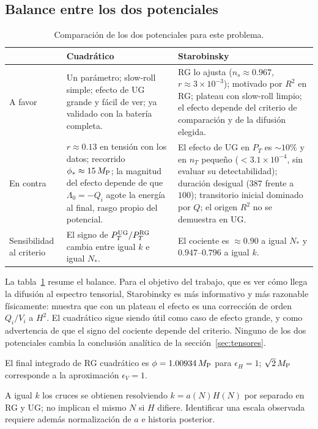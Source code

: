 \subsection{Balance entre los dos potenciales}
\label{sec:balancepot}

\begin{table}[t]
\centering\small
\renewcommand{\arraystretch}{1.25}
\begin{tabular}{@{}p{2.1cm}p{6.3cm}p{6.3cm}@{}}
\toprule
 & \textbf{Cuadrático} & \textbf{Starobinsky}\\
\midrule
A favor & Un parámetro; slow-roll simple; efecto de UG grande y fácil de ver; ya validado con la batería completa. & RG lo ajusta ($n_s\approx0.967$, $r\approx3\times10^{-3}$); motivado por $R^2$ en RG; plateau con slow-roll limpio; el efecto depende del criterio de comparación y de la difusión elegida.\\
En contra & $r\approx0.13$ en tensión con los datos; recorrido $\phi_*\approx15\,M_{\rm P}$; la magnitud del efecto depende de que $\Lambda_0=-Q_i$ agote la energía al final, rasgo propio del potencial. & El efecto de UG en $P_T$ es $\sim10\%$ y en $n_T$ pequeño ($<3.1\times10^{-4}$, sin evaluar su detectabilidad); duración desigual ($387$ frente a $100$); transitorio inicial dominado por $Q$; el origen $R^2$ no se demuestra en UG.\\
Sensibilidad al criterio & El signo de $P_T^{\rm UG}/P_T^{\rm RG}$ cambia entre igual $k$ e igual $N_*$. & El cociente es $\approx0.90$ a igual $N_*$ y $0.947$--$0.796$ a igual $k$.\\
\bottomrule
\end{tabular}
\caption{Comparación de los dos potenciales para este problema.}
\label{tab:balancepot}
\end{table}

La tabla~\ref{tab:balancepot} resume el balance. Para el objetivo del trabajo, que es ver cómo llega la difusión al espectro tensorial, Starobinsky es más informativo y más razonable físicamente: muestra que con un plateau el efecto es una corrección de orden $Q_i/V_i$ a $H^2$. El cuadrático sigue siendo útil como caso de efecto grande, y como advertencia de que el signo del cociente depende del criterio. Ninguno de los dos potenciales cambia la conclusión analítica de la sección~\ref{sec:tensores}.

El final integrado de RG cuadrático es $\phi=1.00934\,M_{\rm P}$ para $\epsilon_H=1$; $\sqrt{2}\,M_{\rm P}$ corresponde a la aproximación $\epsilon_V=1$.

A igual $k$ los cruces se obtienen resolviendo $k=a(N)H(N)$ por separado en RG y UG; no implican el mismo $N$ si $H$ difiere. Identificar una escala observada requiere además normalización de $a$ e historia posterior.
